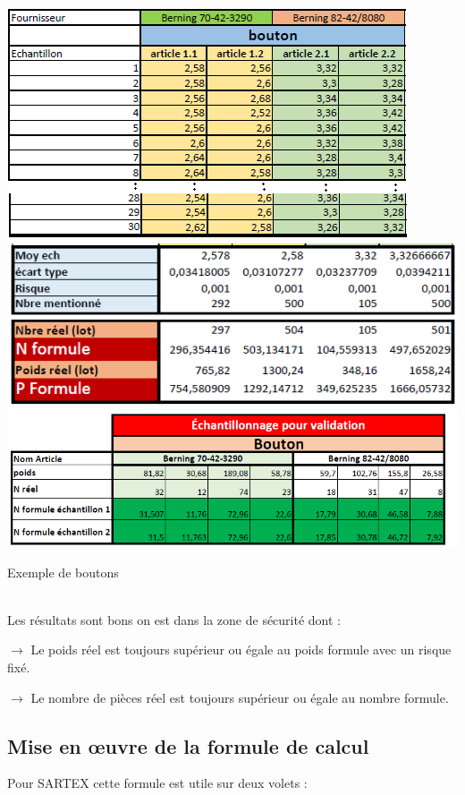 \documentclass[12pt, a4paper]{thesis}
\begin{document}
\begin{center}
 \includegraphics[scale=0.9]{bouton.png} 
 \includegraphics[scale=0.8]{param.PNG}
  \includegraphics[scale=0.75]{echh.PNG}
\end{center}
\begin{table}[!htbp]
\begin{center}
\caption{Exemple de boutons}
 \end{center}
\end{table}\\


Les résultats sont bons on est dans la zone de sécurité dont :
\item $ \rightarrow $  Le poids réel est toujours supérieur ou égale au poids formule avec un risque fixé.
\item  $ \rightarrow $ Le nombre de pièces réel est toujours supérieur ou égale au nombre formule.


\subsection{Mise en œuvre de la formule de calcul}
Pour SARTEX cette formule est utile sur deux volets : 
\end{document}
